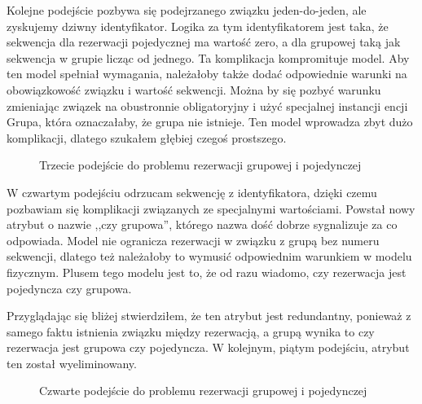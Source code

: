 \documentclass[a4paper,onecolumn,oneside,11pt,wide,floatssmall]{mwrep}
\theoremstyle{definition}
\theoremstyle{plain}%
\theoremstyle{remark}
\begin{document}
Kolejne podejście pozbywa się podejrzanego związku jeden-do-jeden, ale zyskujemy dziwny identyfikator. Logika za tym identyfikatorem jest taka, że sekwencja dla rezerwacji pojedycznej ma wartość zero, a dla grupowej taką jak sekwencja w grupie licząc od jednego. Ta komplikacja kompromituje model. Aby ten model spełniał wymagania, należałoby także dodać odpowiednie warunki na obowiązkowość związku i wartość sekwencji. Można by się pozbyć warunku zmieniając związek na obustronnie obligatoryjny i użyć specjalnej instancji encji Grupa, która oznaczałaby, że grupa nie istnieje. Ten model wprowadza zbyt dużo komplikacji, dlatego szukałem głębiej czegoś prostszego.

\begin{figure}[H]
  \begin{center}
  \end{center}
  \caption{Trzecie podejście do problemu rezerwacji grupowej i pojedynczej}
  \label{fig:db-logical-model-group-reservation-third-try}
\end{figure}

W czwartym podejściu odrzucam sekwencję z identyfikatora, dzięki czemu pozbawiam się komplikacji związanych ze specjalnymi wartościami. Powstał nowy atrybut o nazwie ,,czy grupowa'', którego nazwa dość dobrze sygnalizuje za co odpowiada. Model nie ogranicza rezerwacji w związku z grupą bez numeru sekwencji, dlatego też należałoby to wymusić odpowiednim warunkiem w modelu fizycznym. Plusem tego modelu jest to, że od razu wiadomo, czy rezerwacja jest pojedyncza czy grupowa. 

Przyglądając się bliżej stwierdziłem, że ten atrybut jest redundantny, ponieważ z samego faktu istnienia związku między rezerwacją, a grupą wynika to czy rezerwacja jest grupowa czy pojedyncza. W kolejnym, piątym podejściu, atrybut ten został wyeliminowany.

\begin{figure}[H]
  \begin{center}
  \end{center}
  \caption{Czwarte podejście do problemu rezerwacji grupowej i pojedynczej}
  \label{fig:db-logical-model-group-reservation-fourth-try}
\end{figure}
\end{document}
